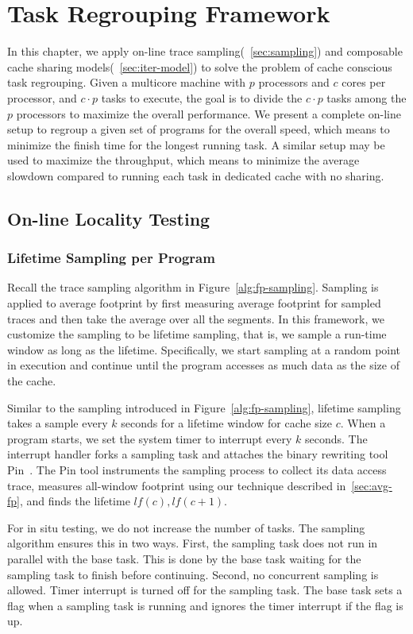 \chapter{Task Regrouping Framework}
\label{chap:regroup}

In this chapter, we apply on-line trace sampling(~\ref{sec:sampling})
and composable cache sharing models(~\ref{sec:iter-model}) to solve
the problem of cache conscious task regrouping.  Given a multicore
machine with $p$ processors and $c$ cores per processor, and $c \cdot
p$ tasks to execute, the goal is to divide the $c \cdot p$ tasks among
the $p$ processors to maximize the overall performance.  We present a
complete on-line setup to regroup a given set of programs for the
overall speed, which means to minimize the finish time for the longest
running task.  A similar setup may be used to maximize the throughput,
which means to minimize the average slowdown compared to running each
task in dedicated cache with no sharing. 

\section{On-line Locality Testing}
\subsection{Lifetime Sampling per Program}
\label{sec:lf-sampling}
Recall the trace sampling algorithm in
Figure~\ref{alg:fp-sampling}. Sampling is applied to average footprint
by first measuring average footprint for sampled traces and then take
the average over all the segments. In this framework, we customize the
sampling to be lifetime sampling, that is, we sample a run-time window
as long as the lifetime. Specifically, we start sampling at a random
point in execution and continue until the program accesses as much
data as the size of the cache. 

Similar to the sampling introduced in Figure~\ref{alg:fp-sampling},
lifetime sampling takes a sample every $k$ seconds for a lifetime
window for cache size $c$. When a program starts, we set the system
timer to interrupt every $k$ seconds. The interrupt handler forks a
sampling task and attaches the binary rewriting tool
Pin~\cite{Pin:PLDI05}.  The Pin tool instruments the sampling process
to collect its data access trace, measures all-window footprint using
our technique described in~\ref{sec:avg-fp}, and finds the
lifetime $lf(c),lf(c+1)$.  

For in situ testing, we do not increase the number of tasks.  The
sampling algorithm ensures this in two ways.  First, the sampling task
does not run in parallel with the base task.  This is done by the base
task waiting for the sampling task to finish before continuing.
Second, no concurrent sampling is allowed.  Timer interrupt is turned
off for the sampling task.  The base task sets a flag when a sampling
task is running and ignores the timer interrupt if the flag is up.

